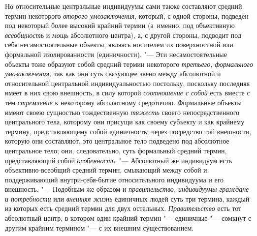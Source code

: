 Но относительные центральные индивидуумы сами также составляют
средний термин некоторого {\em второго
умозаключения,} который, с одной стороны, подведён под
некоторый более высокий крайний термин (а~именно, под объективную
{\em всеобщность} и {\em мощь} абсолютного
центра), а, с другой стороны, подводит под себя несамостоятельные объекты,
являясь носителем их поверхностной или формальной изолированности
(единичности).
"--- Эти несамостоятельные объекты тоже образуют
собой средний термин некоторого
{\em третьего,}
{\em формального умозаключения,}
так как они суть связующее звено между абсолютной и
относительной центральной индивидуальностью постольку, поскольку последняя
имеет в них свою внешность, в силу которой
{\em соотношение с собой}
есть вместе с тем
{\em стремление} к
некоторому абсолютному средоточию. Формальные объекты имеют своею сущностью
тождественную {\em тяжесть}
своего непосредственного центрального тела, которому они
присущи как своему субъекту и как крайнему термину, представляющему собой
единичность; через посредство той внешности, которую они составляют, это
центральное тело подведено под абсолютное центральное тело; они,
следовательно, суть формальный средний термин, представляющий собой
{\em особенность}.
"--- Абсолютный же индивидуум есть объективно-всеобщий средний
термин, смыкающий между собой и поддерживающий внутри-себя-бытие
относительного индивидуума и его
внешность.
"--- \label{bkm:bm52b}Подобным же образом и
{\em правительство, индивидуумы-граждане и потребности} или {\em внешняя жизнь}
единичных людей суть три термина, каждый из которых есть
средний термин для двух остальных.
{\em Правительство} есть
тот абсолютный центр, в котором один крайний термин
"--- единичные "--- сомкнут с другим крайним
термином "--- с их внешним
существованием.
